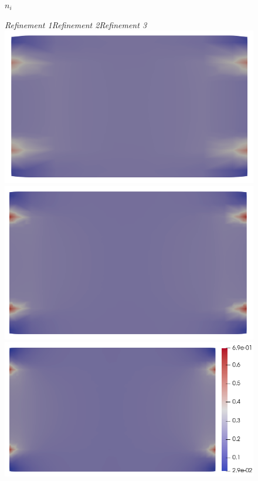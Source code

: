 \documentclass{article}
\begin{document}
\begin{figure}
\begin{minipage}{0.0\textwidth}
    \vspace{1.9cm}
    $n_i$
    \end{minipage}
    \begin{minipage}{0.9\textwidth}
    \centering
    \textit{\textsf{Refinement 1\hspace{2.5cm}Refinement 2\hspace{2.5cm}Refinement 3\hspace{1cm}}}
    \includegraphics[scale=0.27]{slice_E_T-1_lambda-0_8-2-2.png}
    \includegraphics[scale=0.27]{slice_E_T-1_lambda-0_16-3-3.png}
    \includegraphics[scale=0.27]{slice_E_T-1_lambda-0_32-3-4.png}
    

\end{minipage}
\end{figure}
\end{document}
